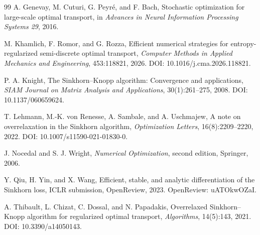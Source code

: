 \documentclass[11pt]{article}
\theoremstyle{definition}
\theoremstyle{remark}
\begin{document}
\begin{thebibliography}{99}
A. Genevay, M. Cuturi, G. Peyr\'e, and F. Bach,
\newblock Stochastic optimization for large-scale optimal transport,
\newblock in \emph{Advances in Neural Information Processing Systems
29}, 2016.

M. Khamlich, F. Romor, and G. Rozza,
\newblock Efficient numerical strategies for entropy-regularized
semi-discrete optimal transport,
\newblock \emph{Computer Methods in Applied Mechanics and Engineering},
453:118821, 2026.
\newblock DOI: 10.1016/j.cma.2026.118821.

P. A. Knight,
\newblock The Sinkhorn--Knopp algorithm: Convergence and applications,
\newblock \emph{SIAM Journal on Matrix Analysis and Applications},
30(1):261--275, 2008.
\newblock DOI: 10.1137/060659624.

T. Lehmann, M.-K. von Renesse, A. Sambale, and A. Uschmajew,
\newblock A note on overrelaxation in the Sinkhorn algorithm,
\newblock \emph{Optimization Letters}, 16(8):2209--2220, 2022.
\newblock DOI: 10.1007/s11590-021-01830-0.

J. Nocedal and S. J. Wright,
\newblock \emph{Numerical Optimization}, second edition,
\newblock Springer, 2006.

Y. Qiu, H. Yin, and X. Wang,
\newblock Efficient, stable, and analytic differentiation of the
Sinkhorn loss,
\newblock ICLR submission, OpenReview, 2023.
\newblock OpenReview: uATOkwOZaI.

A. Thibault, L. Chizat, C. Dossal, and N. Papadakis,
\newblock Overrelaxed Sinkhorn--Knopp algorithm for regularized optimal
transport,
\newblock \emph{Algorithms}, 14(5):143, 2021.
\newblock DOI: 10.3390/a14050143.

\end{thebibliography}
\end{document}
